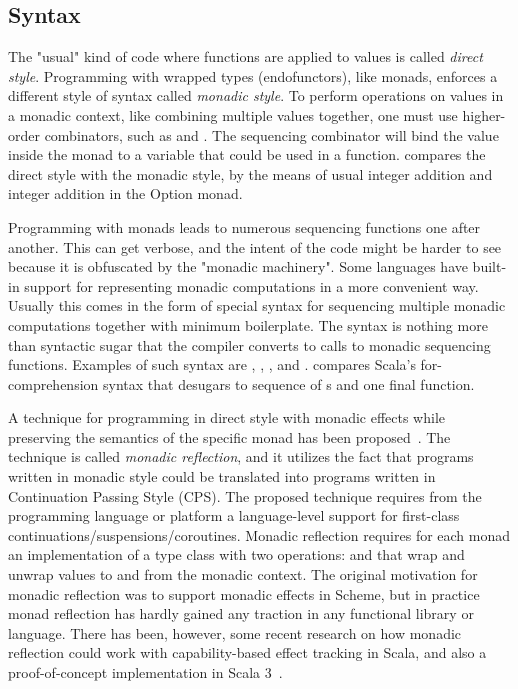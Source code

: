 \subsection{Syntax} \label{monads:syntax}
The "usual" kind of code where functions are applied to values is called \emph{direct style}. Programming with wrapped types (endofunctors), like monads, enforces a different style of syntax called \emph{monadic style}. To perform operations on values in a monadic context, like combining multiple values together, one must use higher-order combinators, such as  and . The sequencing combinator will bind the value inside the monad to a variable that could be used in a function.  compares the direct style with the monadic style, by the means of usual integer addition and integer addition in the Option monad.



Programming with monads leads to numerous sequencing functions one after another. This can get verbose, and the intent of the code might be harder to see because it is obfuscated by the "monadic machinery". Some languages have built-in support for representing monadic computations in a more convenient way. Usually this comes in the form of special syntax for sequencing multiple monadic computations together with minimum boilerplate. The syntax is nothing more than syntactic sugar that the compiler converts to calls to monadic sequencing functions. Examples of such syntax are \textcite{haskell-do-notation}, \textcite{scala-for-comprehension}, \textcite{fsharp-computation-expression}, and \textcite{ocaml-bind-ops}.  compares Scala's for-comprehension syntax that desugars to sequence of s and one final  function.



A technique for programming in direct style with monadic effects while preserving the semantics of the specific monad has been proposed~\cite{representing-monads}. The technique is called \emph{monadic reflection}, and it utilizes the fact that programs written in monadic style could be translated into programs written in Continuation Passing Style (CPS). The proposed technique requires from the programming language or platform a language-level support for first-class continuations/suspensions/coroutines. Monadic reflection requires for each monad an implementation of a type class with two operations:  and  that wrap and unwrap values to and from the monadic context. The original motivation for monadic reflection was to support monadic effects in Scheme, but in practice monad reflection has hardly gained any traction in any functional library or language. There has been, however, some recent research on how monadic reflection could work with capability-based effect tracking in Scala, and also a proof-of-concept implementation in Scala 3~\cite{representing-monads-capabilities, monadic-reflection-scala}.



